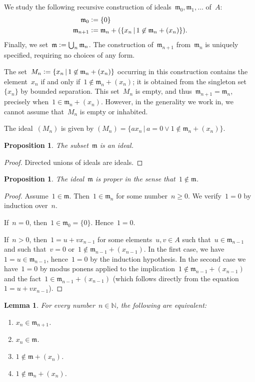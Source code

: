 \documentclass[12pt,oneside,reqno]{amsart}
\theoremstyle{definition}
\theoremstyle{plain}
\newtheorem{prop}[defn]{Proposition}
\newtheorem{lemma}[defn]{Lemma}
\theoremstyle{remark}
\newcommand{\mmm}{\mathfrak{m}}
\newcommand{\NN}{\mathbb{N}}
\newcommand{\defeq}{\vcentcolon=}
\renewcommand{\_}{\mathpunct{.}\,}
\begin{document}
We study the following recursive construction of ideals~$\mmm_0, \mmm_1,
\ldots$ of~$A$:
\begin{align*}
  \mmm_0 &\defeq \{0\} \\
  \mmm_{n+1} &\defeq \mmm_n + (\{ x_n \,|\, 1 \not\in \mmm_n + (x_n) \}).
\end{align*}
Finally, we set~$\mmm \defeq \bigcup_n \mmm_n$. The construction
of~$\mmm_{n+1}$ from~$\mmm_n$ is uniquely specified, requiring no choices of
any form.

The set~$M_n \defeq \{ x_n \,|\, 1 \not\in \mmm_n + (x_n) \}$ occurring in this
construction contains the element~$x_n$ if and only if~$1 \not\in \mmm_n +
(x_n)$; it is obtained from the singleton set~$\{x_n\}$ by bounded separation.
This set~$M_n$ is empty, and thus~$\mmm_{n+1} = \mmm_n$, precisely when~$1 \in \mmm_n + (x_n)$.
However, in the generality we work in, we cannot assume that~$M_n$ is empty or
inhabited.

The ideal~$(M_n)$ is given by
$(M_n) = \{ a x_n \,|\, a = 0 \vee 1 \not\in \mmm_n + (x_n) \}$.

\begin{prop}The subset~$\mmm$ is an ideal.
\end{prop}

\begin{proof}Directed unions of ideals are ideals.\end{proof}

\begin{prop}\label{prop:proper}
The ideal~$\mmm$ is \emph{proper} in the sense that~$1 \not\in \mmm$.\end{prop}

\begin{proof}Assume~$1 \in \mmm$. Then~$1 \in \mmm_n$ for some number~$n \geq 0$. We
verify~$1 = 0$ by induction over~$n$.

If~$n = 0$, then~$1 \in \mmm_0 = \{0\}$. Hence~$1 = 0$.

If~$n > 0$, then~$1 = u + v x_{n-1}$ for some elements~$u,v \in A$ such that~$u
\in \mmm_{n-1}$ and such that~$v = 0$ or~$1 \not\in \mmm_{n-1} + (x_{n-1})$.
In the first case, we have~$1 = u \in \mmm_{n-1}$, hence~$1 = 0$ by the induction
hypothesis. In the second case we have~$1 = 0$ by modus ponens applied to the
implication~$1 \not\in \mmm_{n-1} + (x_{n-1})$ and the fact~$1 \in \mmm_{n-1} +
(x_{n-1})$ (which follows directly from the equation~$1 = u + v x_{n-1}$).
\end{proof}

\begin{lemma}\label{lemma:stage}
For every number~$n \in \NN$, the following are equivalent:
\begin{enumerate}
\item $x_n \in \mmm_{n+1}$.
\item $x_n \in \mmm$.
\item $1 \not\in \mmm + (x_n)$.
\item $1 \not\in \mmm_n + (x_n)$.
\end{enumerate}
\end{lemma}
\end{document}
